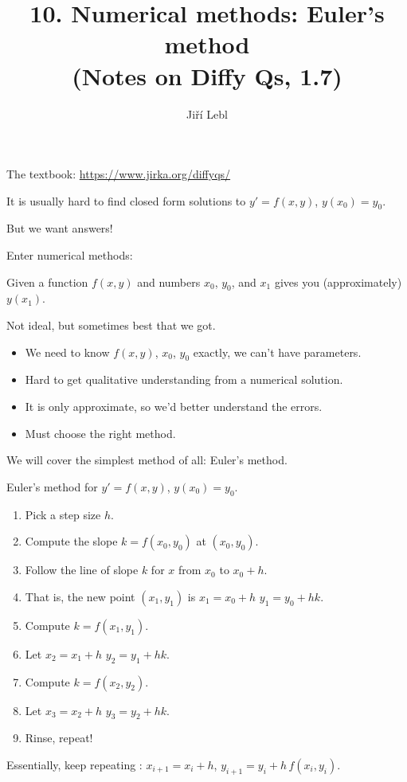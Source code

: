 \documentclass[10pt,aspectratio=169]{beamer}
\author{Ji\v{r}\'i Lebl}
\institute[OSU]{%
Oklahoma State University%
}
\title{10. Numerical methods: Euler's method\\(Notes on Diffy Qs, 1.7)}
\date{}
\begin{document}
\begin{frame}
\titlepage


\begin{center}
The textbook: \url{https://www.jirka.org/diffyqs/}
\end{center}
\end{frame}

\begin{frame}
It is usually hard to find closed form solutions to
\quad
$y' = f(x,y)$, \quad $y(x_0) = y_0$.

\medskip
\pause

But we want answers!

\pause
Enter numerical methods:

Given a function $f(x,y)$ and numbers $x_0$, $y_0$, and $x_1$ gives you (approximately) $y(x_1)$.

\medskip
\pause

Not ideal, but sometimes best that we got.

\begin{itemize}
\item \pause
We need to know $f(x,y)$, $x_0$, $y_0$ exactly, we can't have parameters.
\item \pause
Hard to get qualitative understanding from a numerical solution.
\item \pause
It is only approximate, so we'd better understand the errors.
\item \pause
Must choose the right method.
\end{itemize}

\pause
\medskip

We will cover the simplest method of all: Euler's method.

\end{frame}

\begin{frame}

Euler's method for \quad
$y' = f(x,y)$, \quad $y(x_0) = y_0$.

\begin{enumerate}
\item
\pause
Pick a step size $h$.
\item
\pause
Compute the slope $k = f(x_0,y_0)$ at $(x_0,y_0)$.
\item
\pause
Follow the line of slope $k$ for $x$ from $x_0$ to $x_0+h$.
\item
\pause
That is, the new point $(x_1,y_1)$ is \quad
$x_1 = x_0+h$ \quad $y_1 = y_0 + h k$.
\item
\pause
Compute $k = f(x_1,y_1)$.
\item
\pause
Let $x_2 = x_1+h$ \quad $y_2 = y_1 + h k$.
\item
\pause
Compute $k = f(x_2,y_2)$.
\item
\pause
Let $x_3 = x_2+h$ \quad $y_3 = y_2 + h k$.
\item
\pause
Rinse, repeat!
\end{enumerate}

\pause
Essentially, keep repeating : \quad $x_{i+1} = x_i + h$, \quad $y_{i+1}  = y_i + h\, f(x_i,y_i)$.
\end{frame}
\end{document}
